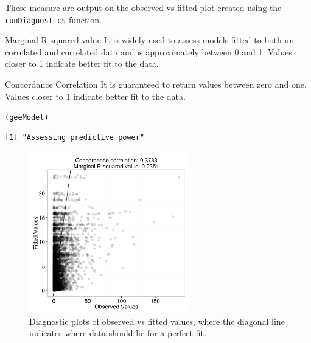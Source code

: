 \begin{frame}[fragile]
These measure are output on the observed vs fitted plot created using the {\tt runDiagnostics} function. 

\begin{block}{Marginal R-squared value}
It is widely used to assess models fitted to both un-correlated and correlated data and is approximately between 0 and 1.  Values closer to 1 indicate better fit to the data.
\end{block}

\begin{block}{Concordance Correlation}
It is guaranteed to return values between zero and one.  Values closer to 1 indicate better fit to the data.
\end{block}

\begin{knitrout}\footnotesize
{}\color{fgcolor}\begin{kframe}
\begin{alltt}
(geeModel)
\end{alltt}
\begin{verbatim}
[1] "Assessing predictive power"
\end{verbatim}
\end{kframe}
\end{knitrout}

\end{frame}

\begin{frame}[fragile]
\begin{figure}[h]
  \centering
    \includegraphics[width=7cm]{bc/FitPlots_fitted.png}
  \caption{Diagnostic plots of observed vs fitted values, where the diagonal line indicates where data should lie for a perfect fit.}
  \label{fig:nsdiagplots1}
\end{figure}
\end{frame}

